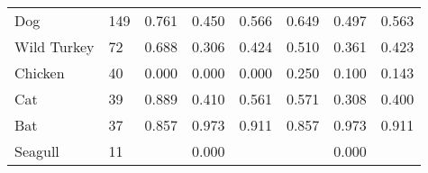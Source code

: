 \begin{table}[t]
\begin{tabular}{llllllll}
\multicolumn{1}{|l|}{Dog}         & \multicolumn{1}{l|}{149}          & 0.761                   & 0.450                   & \multicolumn{1}{l|}{0.566} & 0.649                   & 0.497                   & \multicolumn{1}{l|}{0.563} \\
\multicolumn{1}{|l|}{Wild Turkey} & \multicolumn{1}{l|}{72}           & 0.688                   & 0.306                   & \multicolumn{1}{l|}{0.424} & 0.510                   & 0.361                   & \multicolumn{1}{l|}{0.423} \\
\multicolumn{1}{|l|}{Chicken}     & \multicolumn{1}{l|}{40}           & 0.000                   & 0.000                   & \multicolumn{1}{l|}{0.000} & 0.250                   & 0.100                   & \multicolumn{1}{l|}{0.143} \\
\multicolumn{1}{|l|}{Cat}         & \multicolumn{1}{l|}{39}           & 0.889                   & 0.410                   & \multicolumn{1}{l|}{0.561} & 0.571                   & 0.308                   & \multicolumn{1}{l|}{0.400} \\
\multicolumn{1}{|l|}{Bat}         & \multicolumn{1}{l|}{37}           & 0.857                   & 0.973                   & \multicolumn{1}{l|}{0.911} & 0.857                   & 0.973                   & \multicolumn{1}{l|}{0.911} \\
\multicolumn{1}{|l|}{Seagull}     & \multicolumn{1}{l|}{11}           &                      & 0.000                   & \multicolumn{1}{l|}{}   &                      & 0.000                   & \multicolumn{1}{l|}{}   \\ \hline
\end{tabular}
\label{tab:profile000}
\end{table}